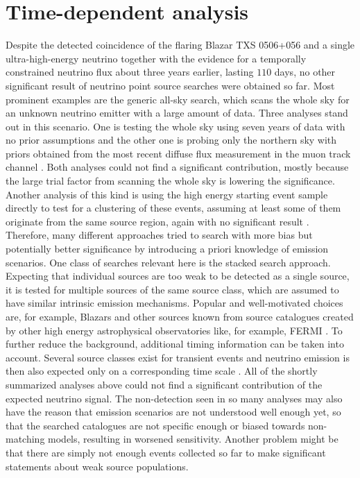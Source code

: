 \chapter{Time-dependent analysis}
  \label{chp:time_dep}
Despite the detected coincidence of the flaring Blazar TXS 0506+056 and a single ultra-high-energy neutrino together with the evidence for a temporally constrained neutrino flux about three years earlier, lasting $\num{110}$ days, no other significant result of neutrino point source searches were obtained so far.
Most prominent examples are the generic all-sky search, which scans the whole sky for an unknown neutrino emitter with a large amount of data.
Three analyses stand out in this scenario.
One is testing the whole sky using seven years of data with no prior assumptions \cite{Aartsen:2016oji} and the other one is probing only the northern sky with priors obtained from the most recent diffuse flux measurement in the muon track channel \cite{Haack:2017dxi,Reimann:2017owh}.
Both analyses could not find a significant contribution, mostly because the large trial factor from scanning the whole sky is lowering the significance.
Another analysis of this kind is using the high energy starting event sample directly to test for a clustering of these events, assuming at least some of them originate from the same source region, again with no significant result \cite{Aartsen:2013jdh}.
Therefore, many different approaches tried to search with more bias but potentially better significance by introducing a priori knowledge of emission scenarios.
One class of searches relevant here is the stacked search approach.
Expecting that individual sources are too weak to be detected as a single source, it is tested for multiple sources of the same source class, which are assumed to have similar intrinsic emission mechanisms.
Popular and well-motivated choices are, for example, Blazars and other sources known from source catalogues created by other high energy astrophysical observatories like, for example, FERMI \cite{Aartsen:2017zvw,Aartsen:2017wea,Aartsen:2016lir,Aartsen:2017ujz}.
To further reduce the background, additional timing information can be taken into account.
Several source classes exist for transient events and neutrino emission is then also expected only on a corresponding time scale \cite{Bianco:2007fe,Komossa:2015qya,Katz:2016dti}.
All of the shortly summarized analyses above could not find a significant contribution of the expected neutrino signal.
The non-detection seen in so many analyses may also have the reason that emission scenarios are not understood well enough yet, so that the searched catalogues are not specific enough or biased towards non-matching models, resulting in worsened sensitivity.
Another problem might be that there are simply not enough events collected so far to make significant statements about weak source populations.

